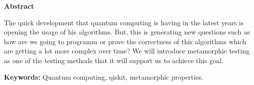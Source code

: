 \newpage

\thispagestyle{empty}

\begin{center}

{\bf \Huge Abstract}

  \end{center}
\vspace{1cm}

The quick development that quantum computing is having in the latest years is opening the usage of his algorithms. But, this is generating new questions such as how are we going to programm or prove the correctness of this algorithms which are getting a lot more complex over time? We will introduce metamorphic testing as one of the testing methods that it will support us to achieve this goal. 
\vspace{2cm}

\textbf{Keywords:} Quantum computing, qiskit, metamorphic properties.